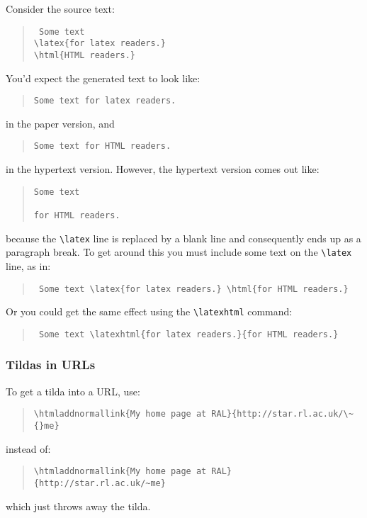\documentclass[twoside,11pt]{article}
\newcommand{\htmladdnormallink}[2]{#1}
\newcommand{\latex}[1]{#1}
\newcommand{\html}[1]{}
\newcommand{\latexhtml}[2]{#1}
\renewcommand{\_}{\texttt{\symbol{95}}}
\begin{document}
Consider the source text:
\begin{quote}
{\tt
Some text\\
\verb+\latex{for latex readers.}+\\
\verb+\html{HTML readers.}+
}
\end{quote}
You'd expect the generated text to look like:
\begin{quote}
\begin{verbatim}
Some text for latex readers.
\end{verbatim}
\end{quote}
in the paper version, and
\begin{quote}
\begin{verbatim}
Some text for HTML readers.
\end{verbatim}
\end{quote}
in the hypertext version.
However, the hypertext version comes out like:
\begin{quote}
\begin{verbatim}
Some text

for HTML readers.
\end{verbatim}
\end{quote}
because the \verb+\latex+ line is replaced by a blank line and
consequently ends up as a paragraph break.
To get around this you must include some text on the \verb+\latex+ line,
as in:
\begin{quote}
{\tt
Some text
\verb+\latex{for latex readers.} \html{for HTML readers.}+
}
\end{quote}
Or you could get the same effect using the \verb+\latexhtml+ command:
\begin{quote}
{\tt
Some text
\verb+\latexhtml{for latex readers.}{for HTML readers.}+
}
\end{quote}


\subsubsection{Tildas in URLs}

To get a tilda into a URL, use:
\begin{quote}
\begin{verbatim}
\htmladdnormallink{My home page at RAL}{http://star.rl.ac.uk/\~{}me}
\end{verbatim}
\end{quote}
instead of:
\begin{quote}
\begin{verbatim}
\htmladdnormallink{My home page at RAL}{http://star.rl.ac.uk/~me}
\end{verbatim}
\end{quote}
which just throws away the tilda.
\end{document}
